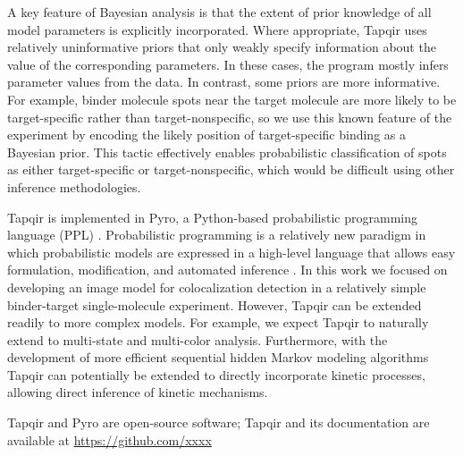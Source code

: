 A key feature of Bayesian analysis is that the extent of prior knowledge of all model parameters is explicitly incorporated. Where appropriate, Tapqir uses relatively uninformative priors that only weakly specify information about the value of the corresponding parameters.  In these cases, the program mostly infers parameter values from the data.  In contrast, some priors are more informative.  For example, binder molecule spots near the target molecule are more likely to be target-specific rather than target-nonspecific, so we use this known feature of the experiment by encoding the likely position of target-specific binding as a Bayesian prior. This tactic effectively enables probabilistic classification of spots as either target-specific or target-nonspecific, which would be difficult using other inference methodologies.

Tapqir is implemented in Pyro, a Python-based probabilistic programming language (PPL) \citep{Bingham2019-qy}. Probabilistic programming is a relatively new paradigm in which probabilistic models are expressed in a high-level language that allows easy formulation, modification, and automated inference \citep{Van_de_Meent2018-mi}. In this work we focused on developing an image model for colocalization detection in a relatively simple binder-target single-molecule experiment. However, Tapqir can be extended readily to more complex models. For example, we expect Tapqir to naturally extend to multi-state and multi-color analysis. Furthermore, with the development of more efficient sequential hidden Markov modeling algorithms \citep{Sarkka2019-jw,Obermeyer2019-pp} Tapqir can potentially be extended to directly incorporate kinetic processes, allowing direct inference of kinetic mechanisms.

Tapqir and Pyro are open-source software; Tapqir and its documentation are available at \url{https://github.com/xxxx}
